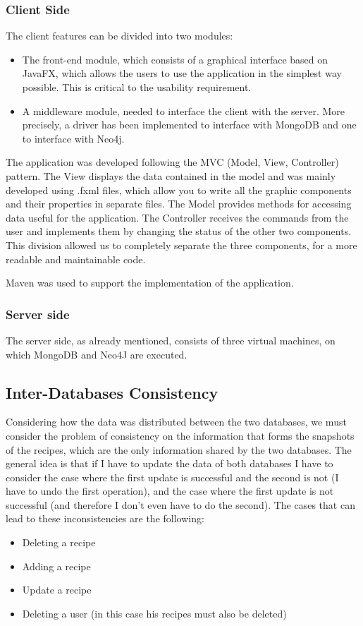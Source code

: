 \documentclass[a4paper]{report}
\begin{document}
\subsubsection{Client Side}
The client features can be divided into two modules:
\begin{itemize}
\item The front-end module, which consists of a graphical interface based on JavaFX, which allows the users to use the application in the simplest way possible. This is critical to the usability requirement.
\item A middleware module, needed to interface the client with the server. More precisely, a driver has been implemented to interface with MongoDB and one to interface with Neo4j.
\end{itemize}
\noindent The application was developed following the MVC (Model, View, Controller) pattern. The View displays the data contained in the model and was mainly developed using .fxml files, which allow you to write all the graphic components and their properties in separate files. The Model provides methods for accessing data useful for the application. The Controller receives the commands from the user and implements them by changing the status of the other two components. This division allowed us to completely separate the three components, for a more readable and maintainable code.

\noindent Maven was used to support the implementation of the application.

\subsubsection{Server side}
The server side, as already mentioned, consists of three virtual machines, on which MongoDB and Neo4J are executed.


\subsection{Inter-Databases Consistency}
Considering how the data was distributed between the two databases, we must consider the problem of consistency on the information that forms the snapshots of the recipes, which are the only information shared by the two databases.
The general idea is that if I have to update the data of both databases I have to consider the case where the first update is successful and the second is not (I have to undo the first operation), and the case where the first update is not successful (and therefore I don't even have to do the second).
The cases that can lead to these inconsistencies are the following:
\begin{itemize}
	\item Deleting a recipe
	\item Adding a recipe
	\item Update a recipe
	\item Deleting a user (in this case his recipes must also be deleted)
\end{itemize}
\end{document}
